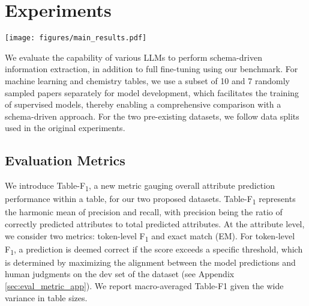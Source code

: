 \documentclass[11pt]{article}
\newcommand\task{\textsc{Schema-to-Json}}
\newcommand\data{\textsc{MlTables}}
\newcommand{\chemtables}{\textsc{ChemTables}}
\newcommand{\discomat}{\textsc{DisCoMat}}
\begin{document}
\section{Experiments}
\label{sec:exp}











\begin{figure*}[ht!]
    \centering
    \texttt{[image: figures/main\_results.pdf]}
    \caption{Capability of various LLMs to perform Schema-Driven IE, measured using the \task{} benchmark. 
As noted in Section \ref{sec:eval_metric}, Table-F\textsubscript{1} is employed for \data{} and \chemtables{}, while Tuple-F\textsubscript{1} is used for \discomat{}. For SWDE, we report Page-F\textsubscript{1}, and $\textit{k}$ represents the number of websites used in training from each vertical. The *GPT-4 result on SWDE is computed on a 1,600 webpage sample due to API budget limitations - see Section \ref{sec:eval} and Footnote \ref{footnote:bootstrap}.
}
    \label{fig:main_results}
\end{figure*}


We evaluate the capability of various LLMs to perform schema-driven information extraction, in addition to full fine-tuning using our benchmark.
For machine learning and chemistry tables, we use a subset of 10 and 7 randomly sampled papers separately for model development, which facilitates the training of supervised models, thereby enabling a comprehensive comparison with a schema-driven approach. For the two pre-existing datasets, we follow data splits used in the original experiments.

\subsection{Evaluation Metrics}
\label{sec:eval_metric}
We introduce Table-F\textsubscript{1}, a new metric gauging overall attribute prediction performance within a table, for our two proposed datasets. Table-F\textsubscript{1} represents the harmonic mean of precision and recall, with precision being the ratio of
correctly predicted attributes to total predicted attributes.
At the attribute level, we consider two metrics: token-level F\textsubscript{1} and exact match (EM). For token-level F\textsubscript{1}, a prediction is deemed correct if the score exceeds a specific threshold, which is determined by maximizing the alignment between the model predictions and human judgments on the dev set of the dataset (see Appendix \ref{sec:eval_metric_app}). 
We report macro-averaged Table-F1 given the wide variance in table sizes.
\end{document}
